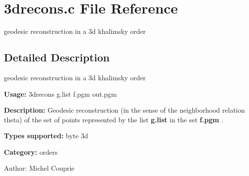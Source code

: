 \section{3drecons.c File Reference}
\label{3drecons_8c}
geodesic reconstruction in a 3d khalimsky order 



\subsection{Detailed Description}
geodesic reconstruction in a 3d khalimsky order 

{\bf Usage:} 3drecons g.list f.pgm out.pgm

{\bf Description:} Geodesic reconstruction (in the sense of the neighborhood relation theta) of the set of points represented by the list {\bf g.list} in the set {\bf f.pgm} .

{\bf Types supported:} byte 3d

{\bf Category:} orders

\begin{Desc}
\item[Author:]Michel Couprie \end{Desc}
